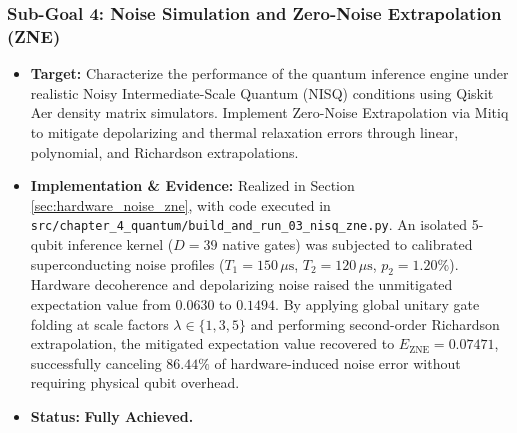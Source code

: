 \subsubsection{Sub-Goal 4: Noise Simulation and Zero-Noise Extrapolation (ZNE)}
\begin{itemize}
    \item \textbf{Target:} Characterize the performance of the quantum inference engine under realistic Noisy Intermediate-Scale Quantum (NISQ) conditions using Qiskit Aer density matrix simulators. Implement Zero-Noise Extrapolation via Mitiq to mitigate depolarizing and thermal relaxation errors through linear, polynomial, and Richardson extrapolations.
    \item \textbf{Implementation \& Evidence:} Realized in Section \ref{sec:hardware_noise_zne}, with code executed in \texttt{src/chapter\_4\_quantum/build\_and\_run\_03\_nisq\_zne.py}. An isolated 5-qubit inference kernel ($D = 39$ native gates) was subjected to calibrated superconducting noise profiles ($T_1 = 150\,\mu\mathrm{s}$, $T_2 = 120\,\mu\mathrm{s}$, $p_2 = 1.20\%$). Hardware decoherence and depolarizing noise raised the unmitigated expectation value from $0.0630$ to $0.1494$. By applying global unitary gate folding at scale factors $\lambda \in \{1, 3, 5\}$ and performing second-order Richardson extrapolation, the mitigated expectation value recovered to $E_{\mathrm{ZNE}} = 0.07471$, successfully canceling $86.44\%$ of hardware-induced noise error without requiring physical qubit overhead.
    \item \textbf{Status:} \textbf{Fully Achieved.}
\end{itemize}

